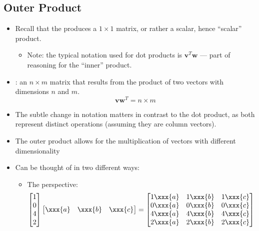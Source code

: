 \begin{itemize}
  \subsection{Outer Product}\label{Outer Product}
  \begin{itemize}
    \item Recall that the \hyperref[Dot (scalar, inner) product]{} produces a \(1\times1 \) matrix, or rather a scalar, hence ``scalar'' product.
      \begin{itemize}
        \item Note: the typical notation used for dot products is \(\bm{v}^T \bm{w}\) --- part of reasoning for the ``inner'' product. 
      \end{itemize}
    \item {}: an \(n\times m\) matrix that results from the product of two vectors with dimensions \(n\) and \(m\).
    \[%
    \bm{v}\bm{w}^T=n\times m
    \]%
    \item The subtle change in notation matters in contrast to the dot product, as both represent distinct operations (assuming they are column vectors).
    \item The outer product allows for the multiplication of vectors with different dimensionality
    \item Can be thought of in two different ways:
    \begin{itemize}
      \item The  perspective:
      \[%
      \begin{bmatrix}
        1 \\
        0 \\
        4 \\
        2
      \end{bmatrix} \begin{bmatrix} \xxx{a} & \xxx{b} & \xxx{c} \end{bmatrix}
      =
      \begin{bmatrix}
        1\xxx{a} & 1\xxx{b} & 1\xxx{c} \\
        0\xxx{a} & 0\xxx{b} & 0\xxx{c} \\
        4\xxx{a} & 4\xxx{b} & 4\xxx{c} \\
        2\xxx{a} & 2\xxx{b} & 2\xxx{c}  
      \end{bmatrix}
      \]%

\end{itemize}
\end{itemize}
\end{itemize}
